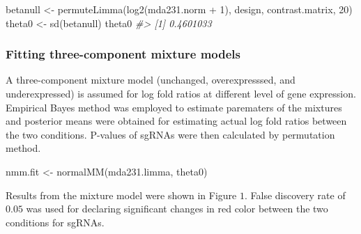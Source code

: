 \documentclass[
]{article}
\newenvironment{Shaded}{\begin{snugshade}}{\end{snugshade}}
\newcommand{\AttributeTok}[1]{\textcolor[rgb]{0.77,0.63,0.00}{#1}}
\newcommand{\CommentTok}[1]{\textcolor[rgb]{0.56,0.35,0.01}{\textit{#1}}}
\newcommand{\DecValTok}[1]{\textcolor[rgb]{0.00,0.00,0.81}{#1}}
\newcommand{\FloatTok}[1]{\textcolor[rgb]{0.00,0.00,0.81}{#1}}
\newcommand{\FunctionTok}[1]{\textcolor[rgb]{0.00,0.00,0.00}{#1}}
\newcommand{\NormalTok}[1]{#1}
\newcommand{\OtherTok}[1]{\textcolor[rgb]{0.56,0.35,0.01}{#1}}
\newcommand{\SpecialCharTok}[1]{\textcolor[rgb]{0.00,0.00,0.00}{#1}}
\begin{document}
\begin{Shaded}
\begin{Highlighting}[]
\NormalTok{betanull }\OtherTok{\textless{}{-}} \FunctionTok{permuteLimma}\NormalTok{(}\FunctionTok{log2}\NormalTok{(mda231.norm }\SpecialCharTok{+} \DecValTok{1}\NormalTok{), design, contrast.matrix, }\DecValTok{20}\NormalTok{)}
\NormalTok{theta0 }\OtherTok{\textless{}{-}} \FunctionTok{sd}\NormalTok{(betanull)}
\NormalTok{theta0}
\CommentTok{\#\textgreater{} [1] 0.4601033}
\end{Highlighting}
\end{Shaded}

\hypertarget{fitting-three-component-mixture-models}{%
\subsubsection{Fitting three-component mixture
models}\label{fitting-three-component-mixture-models}}

A three-component mixture model (unchanged, overexpresssed, and
underexpressed) is assumed for log fold ratios at different level of
gene expression. Empirical Bayes method was employed to estimate
parematers of the mixtures and posterior means were obtained for
estimating actual log fold ratios between the two conditions. P-values
of sgRNAs were then calculated by permutation method.

\begin{Shaded}
\begin{Highlighting}[]
\NormalTok{nmm.fit }\OtherTok{\textless{}{-}} \FunctionTok{normalMM}\NormalTok{(mda231.limma, theta0)}
\end{Highlighting}
\end{Shaded}

Results from the mixture model were shown in Figure \(1\). False
discovery rate of \(0.05\) was used for declaring significant changes in
red color between the two conditions for sgRNAs.

\begin{Shaded}
\end{Shaded}
\end{document}
